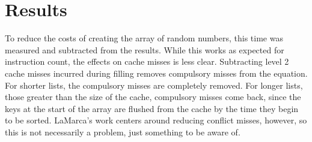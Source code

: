 \label{bugs}

\section{Results}
\label{bug3}
To reduce the costs of creating the array of random numbers, this time was
measured and subtracted from the results. While this works as expected for
instruction count, the effects on cache misses is less clear. Subtracting level
2 cache misses incurred during filling removes compulsory misses from the
equation. For shorter lists, the compulsory misses are completely removed.
For longer lists, those greater than the size of the cache, compulsory misses
come back, since the keys at the start of the array are flushed from the cache
by the time they begin to be sorted. LaMarca's work centers around
reducing conflict misses, however, so this is not necessarily a problem, just
something to be aware of.
